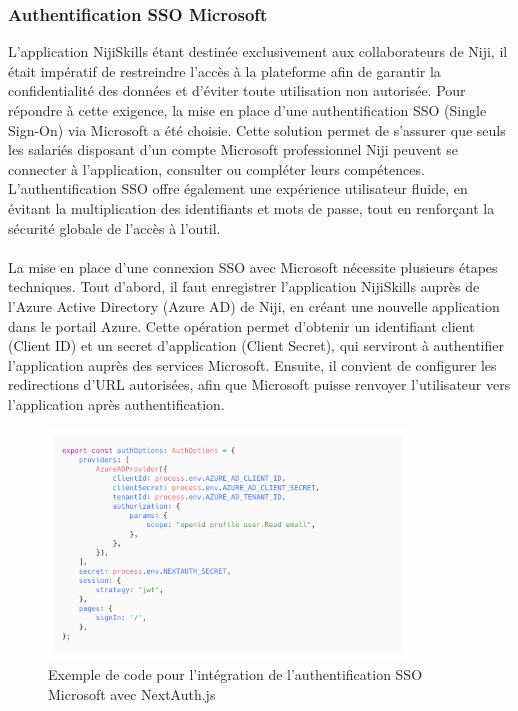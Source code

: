 \documentclass[12pt]{article}
\begin{document}
\subsubsection{Authentification SSO Microsoft}
L’application NijiSkills étant destinée exclusivement aux collaborateurs de Niji, il était impératif de restreindre l’accès à la plateforme afin de garantir la confidentialité des données et d’éviter toute utilisation non autorisée. Pour répondre à cette exigence, la mise en place d’une authentification SSO (Single Sign-On) via Microsoft a été choisie. Cette solution permet de s’assurer que seuls les salariés disposant d’un compte Microsoft professionnel Niji peuvent se connecter à l’application, consulter ou compléter leurs compétences. L’authentification SSO offre également une expérience utilisateur fluide, en évitant la multiplication des identifiants et mots de passe, tout en renforçant la sécurité globale de l’accès à l’outil.
\\\\
La mise en place d’une connexion SSO avec Microsoft nécessite plusieurs étapes techniques. Tout d’abord, il faut enregistrer l’application NijiSkills auprès de l’Azure Active Directory (Azure AD) de Niji, en créant une nouvelle application dans le portail Azure. Cette opération permet d’obtenir un identifiant client (Client ID) et un secret d’application (Client Secret), qui serviront à authentifier l’application auprès des services Microsoft. Ensuite, il convient de configurer les redirections d’URL autorisées, afin que Microsoft puisse renvoyer l’utilisateur vers l’application après authentification.
\begin{figure}[H]
  \centering
  \includegraphics[width=0.85\textwidth]{img/code-auth.png}
  \caption{Exemple de code pour l'intégration de l'authentification SSO Microsoft avec NextAuth.js}
\end{figure}
\end{document}

